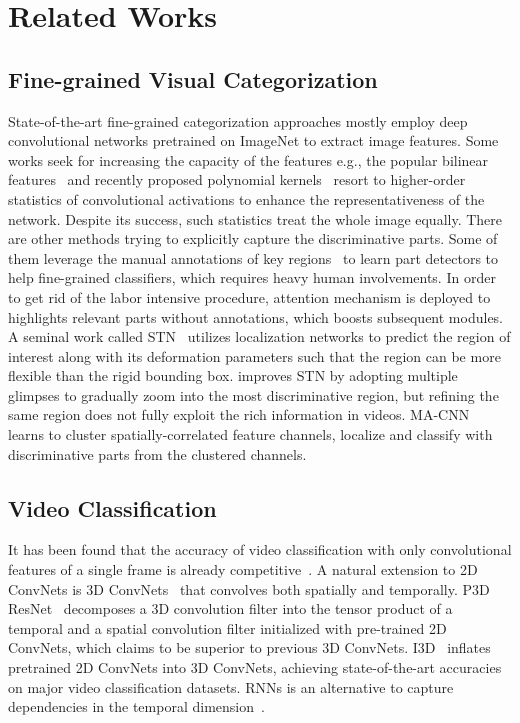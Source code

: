 \documentclass[runningheads]{llncs}
\begin{document}
\section{Related Works}
\subsection{Fine-grained Visual Categorization}
State-of-the-art fine-grained categorization approaches mostly employ deep convolutional networks pretrained on ImageNet to extract image features. Some works seek for increasing the capacity of the features e.g., the popular bilinear features~\cite{lin2015bilinear} and recently proposed polynomial kernels~\cite{Cai_2017_ICCV} resort to higher-order statistics of convolutional activations to enhance the representativeness of the network. Despite its success, such statistics treat the whole image equally. There are other methods trying to explicitly capture the discriminative parts. Some of them leverage the manual annotations of key regions~\cite{WahCUB_200_2011,zhang2016spda,zhang2014part} to learn part detectors to help fine-grained classifiers, which requires heavy human involvements. In order to get rid of the labor intensive procedure, attention mechanism is deployed to highlights relevant parts without annotations, which boosts subsequent modules. A seminal work called STN~\cite{jaderberg2015spatial} utilizes localization networks to predict the region of interest along with its deformation parameters such that the region can be more flexible than the rigid bounding box. \cite{Fu_2017_CVPR} improves STN by adopting multiple glimpses to gradually zoom into the most discriminative region, but refining the same region does not fully exploit the rich information in videos. 
MA-CNN~\cite{Zheng_2017_ICCV} learns to cluster spatially-correlated feature channels, localize and classify with discriminative parts from the clustered channels.

\subsection{Video Classification}
It has been found that the accuracy of video classification with only convolutional features of a single frame is already competitive~\cite{karpathy2014large,qiu2017learning}. 
A natural extension to 2D ConvNets is 3D ConvNets~\cite{ji20133d} that convolves both spatially and temporally. P3D ResNet~\cite{qiu2017learning} decomposes a 3D convolution filter into the tensor product of a temporal and a spatial convolution filter initialized with pre-trained 2D ConvNets, which claims to be superior to previous 3D ConvNets. I3D~\cite{carreira2017quo} inflates pretrained 2D ConvNets into 3D ConvNets, achieving state-of-the-art accuracies on major video classification datasets. RNNs is an alternative to capture dependencies in the temporal dimension~\cite{li2017videolstm,sun2017lattice}.
\end{document}
